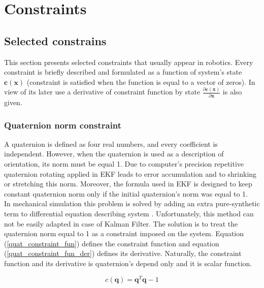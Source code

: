 \chapter{Constraints}


\section{Selected constrains}

This section presents selected constraints that usually appear in robotics. Every constraint is briefly described and formulated as a function of system's state $\bm{c}(\bm{x})$ (constraint is satisfied when the function is equal to a vector of zeros). In view of its later use a derivative of constraint function by state $\frac{\partial \bm{c}(\bm{x})}{\partial \bm{x}}$ is also given.

\subsection{Quaternion norm constraint}

A quaternion is defined as four real numbers, and every coefficient is independent. However, when the quaternion is used as a description of orientation, its norm must be equal 1. Due to computer's precision repetitive quaternion rotating applied in EKF leads to error accumulation and to shrinking or stretching this norm. Moreover, the formula used in EKF is designed to keep constant quaternion norm only if the initial quaternion's norm was equal to 1.\\

In mechanical simulation this problem is solved by adding an extra pure-synthetic term to differential equation describing system \cite{quaternion}. Unfortunately, this method can not be easily adapted in case of Kalman Filter. The solution is to treat the quaternion norm equal to 1 as a constraint imposed on the system. Equation (\ref{quat_constraint_fun}) defines the constraint function and equation (\ref{quat_constraint_fun_der}) defines its derivative. Naturally, the constraint function and its derivative is quaternion's depend only and it is scalar function.

\begin{equation}
	c \left( \bm{q} \right) = \bm{q}^T \bm{q} - 1
\label{quat_constraint_fun}
\end{equation}

